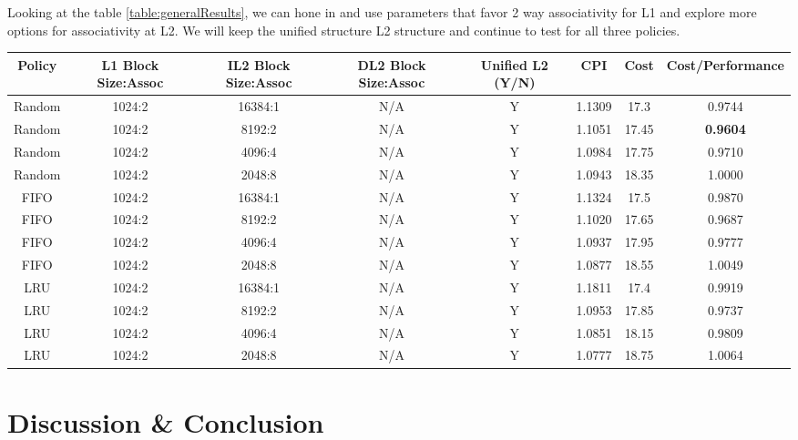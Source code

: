 \documentclass[twocolumn]{article}
\begin{document}
    \label{table:generalResults}
    \medskip
\endgroup

Looking at the table \ref{table:generalResults}, we can hone in and use parameters that favor 2 way associativity for L1 and explore more options for associativity at L2. We will keep the unified structure L2 structure and continue to test for all three policies.

\begingroup
    \medskip
    \centering
    \def\arraystretch{1.5}
        \scriptsize{
        \begin{tabular}{cccccccc}
            \toprule
            Policy & L1 Block Size:Assoc & IL2 Block Size:Assoc & DL2 Block Size:Assoc & Unified L2 (Y/N) & CPI & Cost & Cost/Performance\\
            \midrule
            Random & 1024:2 & 16384:1 & N/A & Y & 1.1309 & 17.3 & 0.9744\\
            Random & 1024:2 & 8192:2 & N/A & Y & 1.1051 & 17.45 & \textbf{0.9604}\\
            Random & 1024:2 & 4096:4 & N/A & Y & 1.0984 & 17.75  & 0.9710\\
            Random & 1024:2 & 2048:8 & N/A & Y & 1.0943 & 18.35 & 1.0000\\
            \midrule
            FIFO & 1024:2 & 16384:1 & N/A & Y & 1.1324 & 17.5 & 0.9870\\
            FIFO & 1024:2 & 8192:2 & N/A & Y & 1.1020 & 17.65 & 0.9687\\
            FIFO & 1024:2 & 4096:4 & N/A & Y & 1.0937 & 17.95 & 0.9777\\
            FIFO & 1024:2 & 2048:8 & N/A & Y & 1.0877 & 18.55 & 1.0049\\
            \midrule
            LRU & 1024:2 & 16384:1 & N/A & Y & 1.1811 & 17.4 & 0.9919\\
            LRU & 1024:2 & 8192:2 & N/A & Y & 1.0953 & 17.85 & 0.9737\\
            LRU & 1024:2 & 4096:4 & N/A & Y & 1.0851& 18.15 & 0.9809\\
            LRU & 1024:2 & 2048:8 & N/A & Y & 1.0777 & 18.75 & 1.0064\\
            \bottomrule
        \end{tabular}
        }
    \label{table:targetedResults}
    \medskip
\endgroup

\section{Discussion \& Conclusion}
\end{document}
